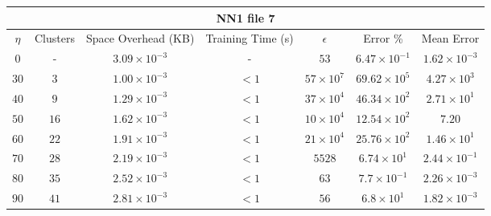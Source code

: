 \begin{adjustwidth}{-1cm}{}
\begin{tabular}{ccccccc}
\hline
\multicolumn{7}{c}{NN1 file 7} \\
\toprule
$\eta$ & Clusters & Space Overhead (KB) & Training Time (s) & $\epsilon$ & Error \% & Mean Error\\
\midrule
$0$ & - & $3.09 \times 10^{-3}$ & - & $53$ & $6.47 \times 10^{-1}$ & $1.62 \times 10^{-3}$\\
$30$ & $3$ & $1.00 \times 10^{-3}$ & $<1$ & $57 \times 10^7$ & $69.62 \times 10^5$ & $4.27 \times 10^3$\\
$40$ & $9$ & $1.29 \times 10^{-3}$ & $<1$ & $37 \times 10^4$ & $46.34 \times 10^2$ & $2.71 \times 10^1$\\
$50$ & $16$ & $1.62 \times 10^{-3}$ & $<1$ & $10 \times 10^4$ & $12.54 \times 10^2$ & $7.20$\\
$60$ & $22$ & $1.91 \times 10^{-3}$ & $<1$ & $21 \times 10^4$ & $25.76 \times 10^2$ & $1.46 \times 10^1$\\
$70$ & $28$ & $2.19 \times 10^{-3}$ & $<1$ & $5528$ & $6.74  \times 10^1$ & $2.44 \times 10^{-1}$\\
$80$ & $35$ & $2.52 \times 10^{-3}$ & $<1$ & $63$ & $7.7 \times 10^{-1}$ & $2.26 \times 10^{-3}$\\
$90$ & $41$ & $2.81 \times 10^{-3}$ & $<1$ & $56$ & $6.8  \times 10^1$ & $1.82 \times 10^{-3}$\\
\bottomrule
\end{tabular}
\end{adjustwidth}

\par\null\par
\par\null\par


